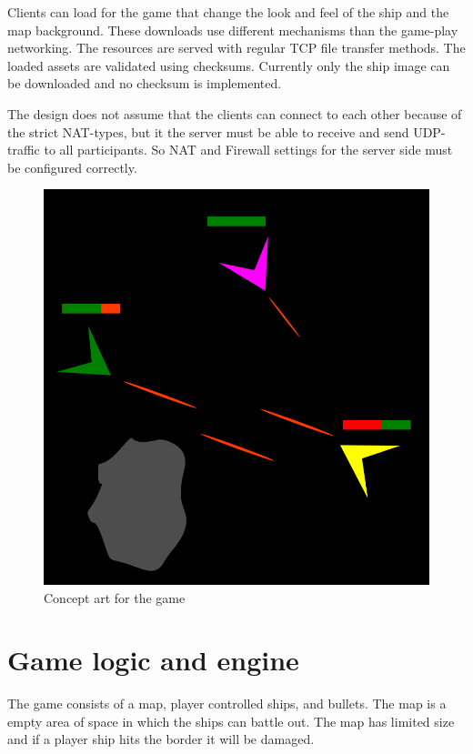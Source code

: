 \documentclass[10pt,a4paper]{article}
\begin{document}
 Clients can load for the game that change the look and feel of
 the ship and the map background. These downloads use different mechanisms than
 the game-play networking. The resources are served with regular TCP file
 transfer methods. The loaded assets are validated using checksums.
 Currently only the ship image can be downloaded and no checksum is implemented.

 The design does not assume that the clients can connect to each other
 because of the strict NAT-types, but it the server must be able to 
 receive and send UDP-traffic to all participants. So NAT and Firewall settings
 for the server side must be configured correctly.

 \begin{figure}
   \caption{Concept art for the game}
   \includegraphics[scale=0.4]{concept.png}
 \end{figure}

 \section{Game logic and engine}

 The game consists of a map, player controlled ships, and bullets.  The map is
 a empty area of space in which the ships can battle out. The map has limited
 size and if a player ship hits the border it will be damaged. 
\end{document}
